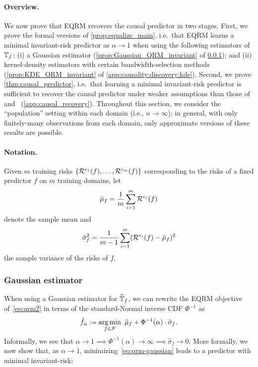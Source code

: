 \documentclass{article}
\begin{document}
\paragraph{Overview.} We now prove that EQRM recovers the causal predictor in two stages. First, we prove the formal versions of \cref{prop:equalize_main}, i.e.\ that EQRM learns a minimal invariant-risk predictor as $\alpha \to 1$ when using the following estimators of $\mathbb{T}_{f}$: (i) a Gaussian estimator (\cref{prop:Gaussian_QRM_invariant} of \cref{app:causality:discovery:gaussian}); and (ii) kernel-density estimators with certain bandwidth-selection methods (\cref{prop:KDE_QRM_invariant} of \cref{app:causality:discovery:kde}). Second, we prove \cref{thm:causal_predictor}, i.e.\ that learning a minimal invariant-risk predictor is sufficient to recover the causal predictor under weaker assumptions than those of~\citet[Thm~2]{peters2016causal} and~\citet[Thm~1]{krueger21rex} (\cref{app:causal_recovery}). Throughout this section, we consider the ``population'' setting within each domain (i.e., $n \to \infty$); in general, with only finitely-many observations from each domain, only approximate versions of these results are possible.


\paragraph{Notation.} Given $m$ training risks $\{\mathcal{R}^{e_1}(f), \dots, \mathcal{R}^{e_m}(f) \}$ corresponding to the risks of a fixed predictor $f$ on $m$ training domains, let
\[\hat{\mu}_f=\frac{1}{m} \sum_{i=1}^m \mathcal{R}^{e_i}(f)\]
denote the sample mean and
\[\hat{\sigma}^2_f=\frac{1}{m-1} \sum_{i=1}^m (\mathcal{R}^{e_i}(f) - \hat{\mu}_f)^2\]
the sample variance of the risks of $f$. 

%
%
%

\subsubsection{Gaussian estimator}
\label{app:causality:discovery:gaussian}
When using a Gaussian estimator for $\widehat{\mathbb{T}}_f$, we can rewrite the EQRM objective of~\eqref{eq:qrm2}
%
%
%
%
%
%
%
%
%
in terms of the standard-Normal inverse CDF $\Phi^{-1}$ as
%
\begin{align}\label{eq:qrm-gaussian}
    \hat f_\alpha := \operatorname*{arg\,min}_{f\in\mathcal{F}}\ \hat{\mu}_f + \Phi^{-1}(\alpha) \cdot \hat{\sigma}_f.
\end{align}
Informally, we see that $\alpha\! \to\! 1\! \implies\! \Phi^{-1}(\alpha)\! \to\! \infty\! \implies\! \hat{\sigma}_f\! \to\! 0$. More formally, we now show that, as $\alpha \to 1$, minimizing~\eqref{eq:qrm-gaussian} leads to a predictor with minimal invariant-risk:
%
%
\end{document}
